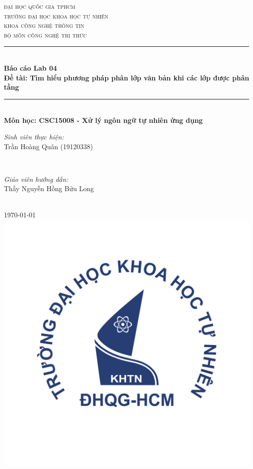 \documentclass[12pt]{article}
\newcommand{\coursename}{CSC15008 - Xử lý ngôn ngữ tự nhiên ứng dụng}
\newcommand{\reportname}{Báo cáo Lab 04}
\begin{document}
\begin{titlepage}
\newcommand{\HRule}{\rule{\linewidth}{0.5mm}}
\centering

\textsc{\LARGE đại học quốc gia tphcm}\\[1.5cm]
\textsc{\Large trường đại học khoa học tự nhiên}\\[0.5cm]
\textsc{\large khoa công nghệ thông tin}\\[0.5cm]
\textsc{bộ môn công nghệ tri thức}\\[0.5cm]

\HRule \\[0.4cm]
{ 
\huge{\bfseries{\reportname}}\\[0.5cm]
\large{\bfseries{Đề tài: Tìm hiểu phương pháp phân lớp văn bản khi các lớp được phân tầng}}
}\\[0.4cm]
\HRule \\[0.5cm]

\textbf{\large Môn học: \coursename}\\[0.5cm]

\begin{minipage}{0.4\textwidth}
\begin{flushleft} \large
\emph{Sinh viên thực hiện:}\\
Trần Hoàng Quân (19120338)
\end{flushleft}
\end{minipage}
~
\begin{minipage}{0.4\textwidth}
\begin{flushright} \large
\emph{Giáo viên hướng dẫn:} \\
Thầy Nguyễn Hồng Bửu Long
\end{flushright}
\end{minipage}\\[2cm]

{\large \today}\\[2cm]

\includegraphics[scale=.3]{img/hcmus-logo.png}\\[1cm] 


\end{titlepage}
\end{document}
